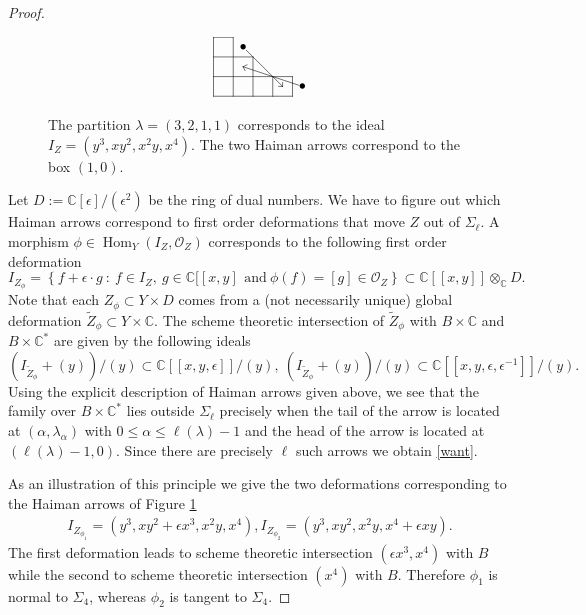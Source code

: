 \documentclass{amsart}
\theoremstyle{definition}
\newcommand{\CC} {\mathbb{C}}          %
\renewcommand{\O}{\mathcal{O}}
\newcommand{\Hom}{\operatorname{Hom}}
\begin{document}
\begin{proof}
 \begin{figure} \label{arrows}
 \begin{displaymath}
 \xy
 (0,0)*{} ; (20,0)*{} **\dir{-} ; (0,0)*{} ; (0,15)*{} **\dir{-} ; (0,15)*{} ; (5,15)*{} **\dir{-} ; (5,0)*{} ; (5,15)*{} **\dir{-} ; (10,0)*{} ; (10,10)*{} **\dir{-} ; (0,10)*{} ; (10,10)*{} **\dir{-} ; (0,5)*{} ; (20,5)*{} **\dir{-} ; (15,0)*{} ; (15,5)*{} **\dir{-} ; (20,0)*{} ; (20,5)*{} **\dir{-} ; (7.5,12.5)*{\bullet} ; (17.5,2.5)*{} **\dir{-} ; (17.5,2.5)*{} ; (16.5,2.5)*{} **\dir{-} ; (17.5,2.5)*{} ; (17.5,3.5)*{} **\dir{-} ; (22.5,2.5)*{\bullet} ; (7.5,7.5)*{} **\dir{-} ; (7.5,7.5)*{} ; (8.5,8)*{} **\dir{-} ; (7.5,7.5)*{} ; (8,6.5)*{} **\dir{-}
 \endxy
 \end{displaymath}
 \caption{The partition $\lambda=(3,2,1,1)$ corresponds to the ideal $I_Z = (y^3, xy^2, x^2y, x^4)$. The two Haiman arrows correspond to the box $(1,0)$.}
 \end{figure}
 
Let $D := \CC[\epsilon] / (\epsilon^2)$ be the ring of dual numbers. We have to figure out which Haiman arrows correspond to first order deformations that move $Z$ out of $\Sigma_\ell$. A morphism $\phi \in \Hom_Y(I_Z,\O_Z)$ corresponds to the following first order deformation
\[
I_{Z_\phi} = \left\{ f + \epsilon \cdot g \ : \  f \in I_Z, \ g \in \CC[\![x,y]\!\, \ \mathrm{and} \ \phi(f) = [g] \in \O_Z \right\} \subset \CC[\![x,y]\!] \otimes_\CC D.
\]
Note that each $Z_\phi \subset Y \times D$ comes from a (not necessarily unique) global deformation $\widetilde{Z}_{\phi} \subset Y \times \CC$. The scheme theoretic intersection of $\widetilde{Z}_{\phi}$ with $B \times \CC$ and $B \times \CC^*$ are given by the following ideals
\[
(I_{\widetilde{Z}_{\phi}} + (y)) / (y) \subset \CC[\![x,y,\epsilon]\!] / (y), \ (I_{\widetilde{Z}_{\phi}} + (y)) / (y) \subset \CC[\![x,y,\epsilon,\epsilon^{-1}]\!] / (y).
\]
Using the explicit description of Haiman arrows given above, we see that the family over $B \times \CC^*$ lies outside $\Sigma_\ell$ precisely when the tail of the arrow is located at $(\alpha,\lambda_\alpha)$ with $0 \leq \alpha \leq \ell(\lambda)-1$ and the head of the arrow is located at $(\ell(\lambda)-1,0)$. Since there are precisely $\ell$ such arrows we obtain \eqref{want}.

As an illustration of this principle we give the two deformations corresponding to the Haiman arrows of Figure \ref{arrows}
\begin{align*}
I_{Z_{\phi_1}} = (y^3, xy^2 + \epsilon x^3, x^2 y, x^4),
I_{Z_{\phi_2}} = (y^3, xy^2, x^2 y, x^4 + \epsilon x y).
\end{align*}
The first deformation leads to scheme theoretic intersection $(\epsilon x^3, x^4)$ with $B$ while the second to scheme theoretic intersection $(x^4)$ with $B$. Therefore $\phi_1$ is normal to $\Sigma_4$, whereas $\phi_2$ is tangent to $\Sigma_4$. 
\end{proof}
\end{document}
